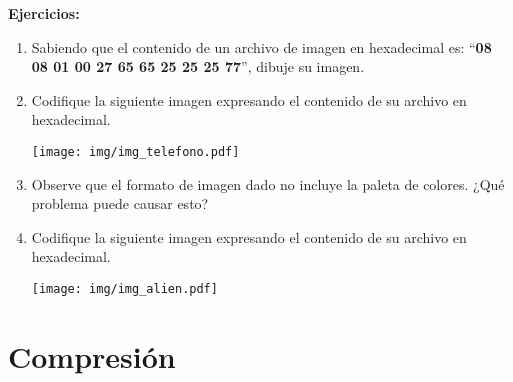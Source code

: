 \documentclass[12pt]{article}
\begin{document}
\textbf{Ejercicios:}

\begin{enumerate}

    \item Sabiendo que el contenido de un archivo de imagen en hexadecimal es:
        ``\textbf{08 08 01 00 27 65 65 25 25 25 77}'', dibuje su imagen.

    \item Codifique la siguiente imagen expresando el contenido de su archivo
        en hexadecimal.

        \texttt{[image: img/img\_telefono.pdf]}

    \item Observe que el formato de imagen dado no incluye la paleta de
        colores. ¿Qué problema puede causar esto?

    \item Codifique la siguiente imagen expresando el contenido de su archivo
        en hexadecimal. \label{ej_img_alien}

        \texttt{[image: img/img\_alien.pdf]}

\end{enumerate}

\section{Compresión}
\label{sec_compresion}
\end{document}
